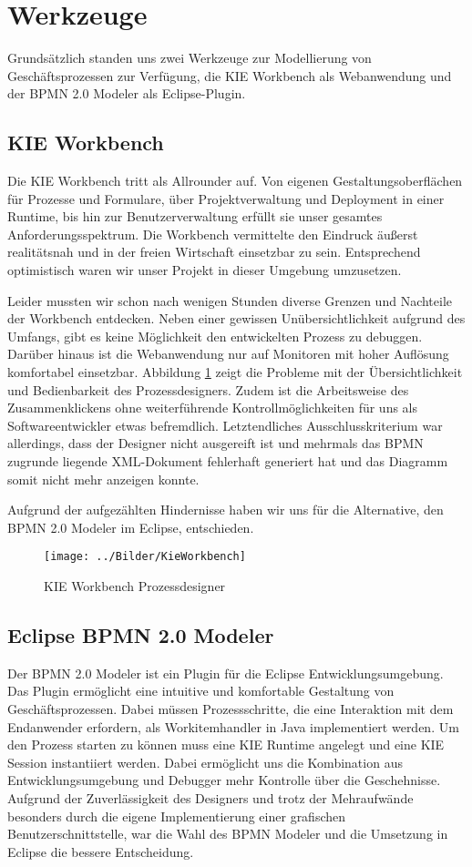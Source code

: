 \section{Werkzeuge}
Grundsätzlich standen uns zwei Werkzeuge zur Modellierung von Geschäftsprozessen zur Verfügung, die KIE Workbench als Webanwendung und der BPMN 2.0 Modeler als Eclipse-Plugin.
\subsection{KIE Workbench}
Die KIE Workbench tritt als Allrounder auf. Von eigenen Gestaltungsoberflächen für Prozesse und Formulare, über Projektverwaltung und Deployment in einer Runtime, bis hin zur Benutzerverwaltung erfüllt sie unser gesamtes Anforderungsspektrum. Die Workbench vermittelte den Eindruck äußerst realitätsnah und in der freien Wirtschaft einsetzbar zu sein. Entsprechend optimistisch waren wir unser Projekt in dieser Umgebung umzusetzen.

Leider mussten wir schon nach wenigen Stunden diverse Grenzen und Nachteile der Workbench entdecken. Neben einer gewissen Unübersichtlichkeit aufgrund des Umfangs, gibt es keine Möglichkeit den entwickelten Prozess zu debuggen. Darüber hinaus ist die Webanwendung nur auf Monitoren mit hoher Auflösung komfortabel einsetzbar. Abbildung \ref{fig:KieWorkbench} zeigt die Probleme mit der Übersichtlichkeit und Bedienbarkeit des Prozessdesigners. Zudem ist die Arbeitsweise des Zusammenklickens ohne weiterführende Kontrollmöglichkeiten für uns als Softwareentwickler etwas befremdlich. Letztendliches Ausschlusskriterium war allerdings, dass der Designer nicht ausgereift ist und mehrmals das BPMN zugrunde liegende XML-Dokument fehlerhaft generiert hat und das Diagramm somit nicht mehr anzeigen konnte.

Aufgrund der aufgezählten Hindernisse haben wir uns für die Alternative, den BPMN 2.0 Modeler im Eclipse, entschieden.

\begin{figure}[H]
\centering
\texttt{[image: ../Bilder/KieWorkbench]}
\caption{KIE Workbench Prozessdesigner}
\label{fig:KieWorkbench}
\end{figure}

\subsection{Eclipse BPMN 2.0 Modeler}
Der BPMN 2.0 Modeler ist ein Plugin für die Eclipse Entwicklungsumgebung. Das Plugin ermöglicht eine intuitive und komfortable Gestaltung von Geschäftsprozessen. Dabei müssen Prozessschritte, die eine Interaktion mit dem Endanwender erfordern, als Workitemhandler in Java implementiert werden. Um den Prozess starten zu können muss eine KIE Runtime angelegt und eine KIE Session instantiiert werden. Dabei ermöglicht uns die Kombination aus Entwicklungsumgebung und Debugger mehr Kontrolle über die Geschehnisse. Aufgrund der Zuverlässigkeit des Designers und trotz der Mehraufwände besonders durch die eigene Implementierung einer grafischen Benutzerschnittstelle, war die Wahl des BPMN Modeler und die Umsetzung in Eclipse die bessere Entscheidung. 